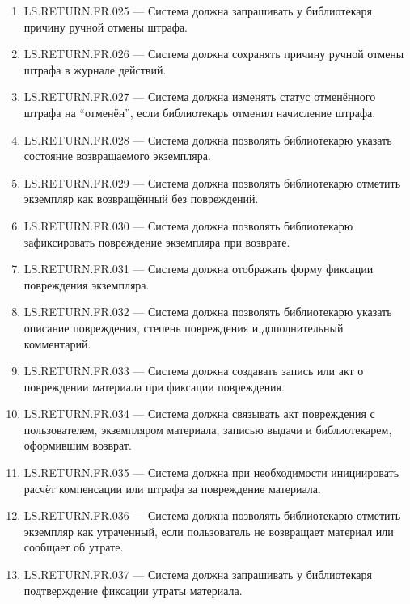 \documentclass[12pt,a4paper]{article}
\begin{document}
\begin{enumerate}
		\item LS.RETURN.FR.025 --- Система должна запрашивать у библиотекаря причину
		ручной отмены штрафа.
		
		\item LS.RETURN.FR.026 --- Система должна сохранять причину ручной отмены штрафа
		в журнале действий.
		
		\item LS.RETURN.FR.027 --- Система должна изменять статус отменённого штрафа
		на ``отменён'', если библиотекарь отменил начисление штрафа.
		
		\item LS.RETURN.FR.028 --- Система должна позволять библиотекарю указать состояние
		возвращаемого экземпляра.
		
		\item LS.RETURN.FR.029 --- Система должна позволять библиотекарю отметить
		экземпляр как возвращённый без повреждений.
		
		\item LS.RETURN.FR.030 --- Система должна позволять библиотекарю зафиксировать
		повреждение экземпляра при возврате.
		
		\item LS.RETURN.FR.031 --- Система должна отображать форму фиксации повреждения
		экземпляра.
		
		\item LS.RETURN.FR.032 --- Система должна позволять библиотекарю указать описание
		повреждения, степень повреждения и дополнительный комментарий.
		
		\item LS.RETURN.FR.033 --- Система должна создавать запись или акт о повреждении
		материала при фиксации повреждения.
		
		\item LS.RETURN.FR.034 --- Система должна связывать акт повреждения с пользователем,
		экземпляром материала, записью выдачи и библиотекарем, оформившим возврат.
		
		\item LS.RETURN.FR.035 --- Система должна при необходимости инициировать расчёт
		компенсации или штрафа за повреждение материала.
		
		\item LS.RETURN.FR.036 --- Система должна позволять библиотекарю отметить
		экземпляр как утраченный, если пользователь не возвращает материал или сообщает
		об утрате.
		
		\item LS.RETURN.FR.037 --- Система должна запрашивать у библиотекаря подтверждение
		фиксации утраты материала.
		

\end{enumerate}
\end{document}
